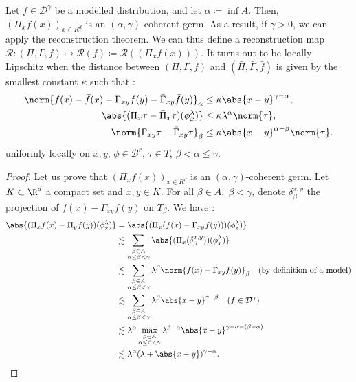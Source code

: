 \begin{remark}
    \label{rk:mod_distrib_is_coh_germ}
    Let $f\in \mathcal{D}^\gamma$ be a modelled distribution, and let $\alpha \coloneq \inf A$.
    Then, $(\Pi_x f(x))_{x\in R^d}$ is an $(\alpha,\gamma)$ coherent germ.
    As a result, if $\gamma>0$, we can apply the reconstruction theorem.
    We can thus define a reconstruction map $\mathcal{R}: (\Pi,\Gamma, f)\mapsto \mathcal{R}(f)\coloneq \mathcal{R}((\Pi_x f(x)))$. It turns out to be locally Lipschitz when the distance between $(\Pi, \Gamma, f)$ and $(\bar{\Pi}, \bar{\Gamma}, \bar{f})$ is given by the smallest constant $\kappa$ such that :
    \begin{align*}
        \norm{f(x) - \bar{f}(x) - \Gamma_{xy}f(y) - \bar{\Gamma}_{xy}\bar{f}(y)}_\alpha &\leq \kappa \abs{x - y}^{\gamma - \alpha},\\
        \abs{(\Pi_x \tau - \bar{\Pi}_x \tau)(\phi^\lambda_x)}&\leq \kappa \lambda^\alpha \norm{\tau}, \\
        \norm{\Gamma_{xy} \tau - \bar{\Gamma}_{xy} \tau}_\beta &\leq \kappa \abs{x-y}^{\alpha - \beta}\norm{\tau}.\\
    \end{align*}
    uniformly locally on $x,y$, $\phi \in \mathcal{B}^r$, $\tau \in T$, $\beta < \alpha \leq \gamma$.
\end{remark}

\begin{proof}
    Let us prove that $(\Pi_x f(x))_{x\in R^d}$ is an $(\alpha,\gamma)$-coherent germ.
    Let $K\subset \R^d$ a compact set and $x,y \in K$.
    For all $\beta \in A, \; \beta<\gamma$, denote $\delta^{x,y}_\beta$ the projection of $f(x) - \Gamma_{xy}f(y)$ on $T_\beta$.
    We have :
    \begin{align*}
        \abs{(\Pi_x f(x) - \Pi_y f(y))(\phi_x^\lambda)} &= \abs{(\Pi_x(f(x) - \Gamma_{xy}f(y)))(\phi^\lambda_x)}\\
        &\lesssim \sum_{\substack{\beta\in A \\ \alpha \leq \beta <\gamma}} \abs{(\Pi_x(\delta^{x,y}_\beta))(\phi^\lambda_x)}\\
        &\lesssim \sum_{\substack{\beta\in A \\ \alpha \leq \beta <\gamma}} \lambda^{\beta} \norm{f(x) - \Gamma_{xy}f(y)}_\beta \quad (\text{by definition of a model})\\
        &\lesssim \sum_{\substack{\beta\in A \\ \alpha \leq \beta <\gamma}} \lambda^{\beta} \abs{x-y}^{\gamma - \beta} \quad (f\in \mathcal{D}^\gamma)\\
        &\lesssim \lambda^\alpha \max_{\substack{\beta\in A \\ \alpha \leq \beta <\gamma}} \lambda^{\beta - \alpha} \abs{x-y}^{\gamma - \alpha - (\beta - \alpha)} \\
        &\lesssim \lambda^\alpha (\lambda + \abs{x-y})^{\gamma - \alpha}.
    \end{align*}
\end{proof}

